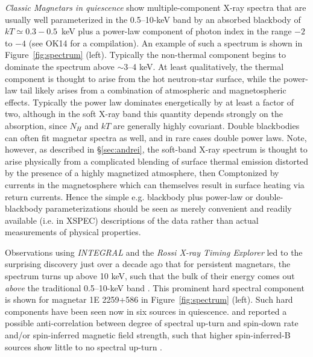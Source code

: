 \noindent
{\it Classic Magnetars in quiescence}
show multiple-component X-ray spectra that are usually well parameterized in the 0.5--10-keV band
by an absorbed blackbody of $kT \simeq 0.3-0.5$~keV plus a power-law component of photon
index in the range $-2$ to $-4$ (see OK14 for a compilation).  An example of such
a spectrum is shown in Figure~\ref{fig:spectrum} (left).   Typically
the non-thermal component begins to dominate the spectrum above $\sim$3--4 keV.
At least qualitatively, the thermal component is thought to arise from the hot neutron-star
surface, while the power-law tail likely arises from a combination of atmospheric 
and magnetospheric effects.
Typically the power law dominates energetically by
at least a factor of two, although in the soft X-ray band this quantity depends
strongly on the absorption, since $N_H$ and $kT$ are generally highly covariant. 
Double blackbodies can often fit magnetar spectra as well, and in rare cases double power laws.
Note, however, as described in \S\ref{sec:andrei}, the soft-band X-ray spectrum is thought
to arise physically from a complicated blending of surface thermal emission distorted
by the presence of a highly magnetized atmosphere, then Comptonized by currents
in the magnetosphere which can themselves result in surface heating via return currents.
Hence the simple e.g. blackbody plus power-law or double-blackbody parameterizations should
be seen as merely convenient and readily available (i.e. in XSPEC) descriptions of the data 
rather than actual measurements of physical properties.  

Observations using {\it INTEGRAL} and the {\it Rossi X-ray Timing Explorer}
led to the surprising discovery just over a decade ago
that for persistent magnetars, the spectrum turns up above 10 keV, such that the bulk of
their energy comes out {\it above} the traditional 0.5--10-keV band \citep{khm04,khdc06}.
This prominent hard spectral component is shown for magnetar 1E 2259+586 in Figure~\ref{fig:spectrum} (left).
Such hard components have been seen now in six sources in quiescence.
\citet{kb10} and \citet{enk+10} 
reported a possible anti-correlation between degree of spectral up-turn and spin-down rate 
and/or spin-inferred magnetic field strength,
such that higher spin-inferred-B sources show little to no
spectral up-turn \citep{mgmh05,gmte06}.

